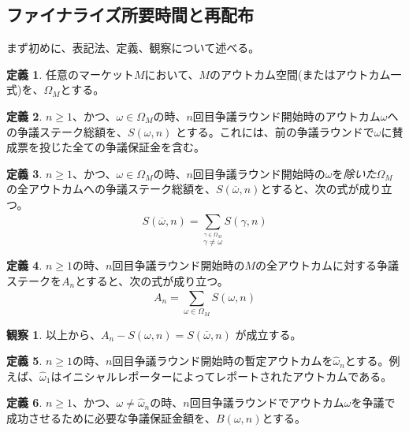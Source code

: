 \documentclass[floatfix,reprint,nofootinbib,amsmath,amssymb,epsfig,pre,floats,letterpaper,groupedaffiliation]{revtex4-1}
\theoremstyle{definition}
\newtheorem{observation}{観察}
\theoremstyle{definition}
\newtheorem{definition}{定義}
\theoremstyle{definition}
\begin{document}
\begin{appendix}

\cleardoublepage

\section{ファイナライズ所要時間と再配布}\label{section:finalization_time}

まず初めに、表記法、定義、観察について述べる。

\begin{definition}
任意のマーケット$M$において、$M$のアウトカム空間(またはアウトカム一式)を、${\Omega}_M$とする。
\end{definition}

\begin{definition}
$n \geq 1$、かつ、$\omega \in {\Omega}_M$の時、$n$回目争議ラウンド開始時のアウトカム$\omega$への争議ステーク総額を、$S(\omega,n)$ とする。これには、前の争議ラウンドで$\omega$に賛成票を投じた全ての争議保証金を含む。
\end{definition}

\begin{definition}
$n \geq 1$、かつ、$\omega \in {\Omega}_M$の時、$n$回目争議ラウンド開始時の$\omega$を\emph{除いた}${\Omega}_M$の全アウトカムへの争議ステーク総額を、$S(\overline{\omega},n)$とすると、次の式が成り立つ。\[ S(\overline{\omega},n)= \sum_{\overset{\gamma \in {\Omega}_M}{\gamma \neq \omega}}^{} S(\gamma,n) \]
\end{definition}

\begin{definition}
$n \geq 1$の時、$n$回目争議ラウンド開始時の$M$の全アウトカムに対する争議ステークを$A_n$とすると、次の式が成り立つ。\[ A_n = \sum_{\omega \in {\Omega}_M}^{} S(\omega,n) \]
\end{definition}

\begin{observation}\label{ob:stake_partition}
以上から、$A_n - S(\omega,n) = S(\overline{\omega},n)$ が成立する。
\end{observation}

\begin{definition}
$n \geq 1$の時、$n$回目争議ラウンド開始時の暫定アウトカムを$\hat{\omega}_{n}$とする。例えば、$\hat{\omega}_{1}$はイニシャルレポーターによってレポートされたアウトカムである。
\end{definition}

\begin{definition}
$n \geq 1$、かつ、$\omega \neq \hat{\omega}_{n}$の時、$n$回目争議ラウンドでアウトカム$\omega$を争議で成功させるために必要な争議保証金額を、$B(\omega,n)$とする。
\end{definition}


\end{appendix}
\end{document}
